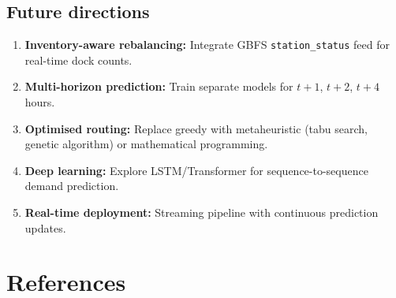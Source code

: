 \documentclass[12pt,a4paper]{report}
\begin{document}
\section{Future directions}

\begin{enumerate}
  \item \textbf{Inventory-aware rebalancing:} Integrate GBFS
        \texttt{station\_status} feed for real-time dock counts.
  \item \textbf{Multi-horizon prediction:} Train separate models for
        $t+1$, $t+2$, $t+4$ hours.
  \item \textbf{Optimised routing:} Replace greedy with metaheuristic
        (tabu search, genetic algorithm) or mathematical programming.
  \item \textbf{Deep learning:} Explore LSTM/Transformer for
        sequence-to-sequence demand prediction.
  \item \textbf{Real-time deployment:} Streaming pipeline with
        continuous prediction updates.
\end{enumerate}

\chapter*{References}
\end{document}

